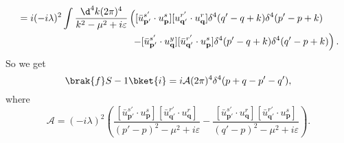 \documentclass[a4paper]{article}
\begin{document}
\begin{eg}
\begin{align*}
    &= i(-i\lambda)^2 \int \frac{\d^4 k (2\pi)^4}{k^2 - \mu^2 + i \varepsilon}\left([\bar u_{\mathbf{p}'}^{s'} \cdot u_\mathbf{p}^s][u_{\mathbf{q}'}^{r'} \cdot u_{\mathbf{q}}^r] \delta^4(q' - q + k)\delta^4(p' - p + k)\right.\\
    &\hphantom{= i(-i\lambda)^2 \int \frac{\d^4 k (2\pi)^4}{k^2 - \mu^2 + i \varepsilon}\Big(}\left.- [\bar u_{\mathbf{p}'}^{s'} \cdot u_\mathbf{q}^y][\bar u_{\mathbf{q}'}^{r'} \cdot u_{\mathbf{p}}^s] \delta^4(p' - q + k)\delta^4(q' - p + k)\right).
  \end{align*}
  So we get
  \[
    \brak{f}S - 1\bket{i} = i \mathcal{A}(2\pi)^4 \delta^4(p + q - p' - q'),
  \]
  where
  \[
    \mathcal{A} = (-i \lambda)^2 \left( \frac{[\bar u_{\mathbf{p}'}^{s'} \cdot u_\mathbf{p}^s][\bar u_{\mathbf{q}'}^{r'} \cdot u_\mathbf{q}^r]}{(p' - p)^2 - \mu^2 + i \varepsilon} - \frac{[\bar u_{\mathbf{p}'}^{s'} \cdot u_\mathbf{q}^r][\bar u_{\mathbf{q}'}^{r'} \cdot u_\mathbf{p}^s]}{(q' - p)^2 - \mu^2 + i \varepsilon}\right).
  \]
\end{eg}
\end{document}
